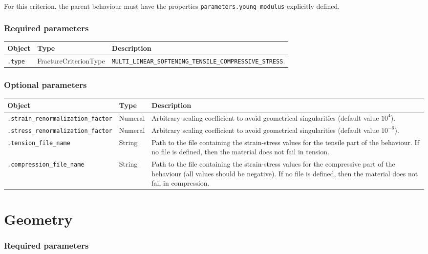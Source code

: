 \documentclass[10pt]{article}
\begin{document}
For this criterion, the parent behaviour must have the properties \verb+parameters.young_modulus+ explicitly defined.

\subsubsection*{Required parameters}

\begin{tabularx}{\textwidth}{llX}
\hline 
Object & Type & Description \\ 
\hline 
\verb+.type+ & FractureCriterionType & \verb+MULTI_LINEAR_SOFTENING_TENSILE_COMPRESSIVE_STRESS+. \\ 
\hline 
\end{tabularx}

\subsubsection*{Optional parameters}

\begin{tabularx}{\textwidth}{llX}
\hline 
Object & Type & Description \\ 
\hline 
\verb+.strain_renormalization_factor+ & Numeral & Arbitrary scaling coefficient to avoid geometrical singularities (default value $10^4$).\\
\verb+.stress_renormalization_factor+ & Numeral & Arbitrary scaling coefficient to avoid geometrical singularities (default value $10^{-6}$).\\
\verb+.tension_file_name+ & String & Path to the file containing the strain-stress values for the tensile part of the behaviour. If no file is defined, then the material does not fail in tension.\\
\verb+.compression_file_name+ & String & Path to the file containing the strain-stress values for the compressive part of the behaviour (all values should be negative). If no file is defined, then the material does not fail in compression.\\
\hline 
\end{tabularx}

\section{Geometry}

\subsubsection*{Required parameters}
\end{document}
